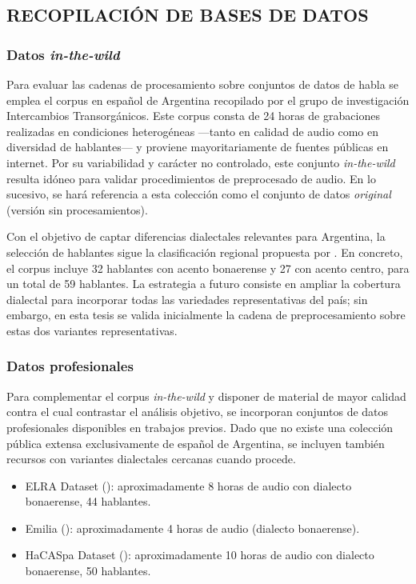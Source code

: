 \subsection{RECOPILACIÓN DE BASES DE DATOS}

\subsubsection{Datos \emph{in-the-wild}}
Para evaluar las cadenas de procesamiento sobre conjuntos de datos de habla se emplea el corpus en español de Argentina recopilado por el grupo de investigación Intercambios Transorgánicos. Este corpus consta de 24 horas de grabaciones realizadas en condiciones heterogéneas —tanto en calidad de audio como en diversidad de hablantes— y proviene mayoritariamente de fuentes públicas en internet. Por su variabilidad y carácter no controlado, este conjunto \emph{in-the-wild} resulta idóneo para validar procedimientos de preprocesado de audio. En lo sucesivo, se hará referencia a esta colección como el conjunto de datos \emph{original} (versión sin procesamientos).

Con el objetivo de captar diferencias dialectales relevantes para Argentina, la selección de hablantes sigue la clasificación regional propuesta por \cite{Fontanella2004español}. En concreto, el corpus incluye 32 hablantes con acento bonaerense y 27 con acento centro, para un total de 59 hablantes. La estrategia a futuro consiste en ampliar la cobertura dialectal para incorporar todas las variedades representativas del país; sin embargo, en esta tesis se valida inicialmente la cadena de preprocesamiento sobre estas dos variantes representativas.

\subsubsection{Datos profesionales}
Para complementar el corpus \emph{in-the-wild} y disponer de material de mayor calidad contra el cual contrastar el análisis objetivo, se incorporan conjuntos de datos profesionales disponibles en trabajos previos. Dado que no existe una colección pública extensa exclusivamente de español de Argentina, se incluyen también recursos con variantes dialectales cercanas cuando procede.

\begin{itemize}
\item ELRA Dataset (\cite{google-arg}): aproximadamente 8 horas de audio con dialecto bonaerense, 44 hablantes.
\item Emilia (\cite{datset_arg}): aproximadamente 4 horas de audio (dialecto bonaerense). %
\item HaCASpa Dataset (): aproximadamente 10 horas de audio con dialecto bonaerense, 50 hablantes.
\end{itemize}

